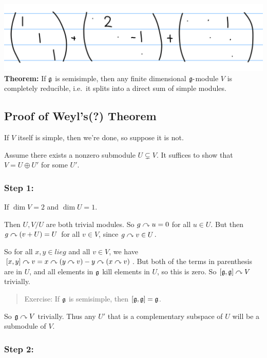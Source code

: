 \includegraphics{figures/2019-09-16-09:15.png}\\

\textbf{Theorem:} If \({\mathfrak{g}}\) is semisimple, then any finite
dimensional \({\mathfrak{g}}{\hbox{-}}\)module \(V\) is completely reducible, i.e.~it
splits into a direct sum of simple modules.

\hypertarget{proof-of-weyls-theorem}{%
\subsection{Proof of Weyl's(?) Theorem}\label{proof-of-weyls-theorem}}

If \(V\) itself is simple, then we're done, so suppose it is not.

Assume there exists a nonzero submodule \(U \subsetneq V\). It suffices
to show that \(V = U \oplus U'\) for some \(U'\).

\hypertarget{step-1}{%
\subsubsection{Step 1:}\label{step-1}}

If \(\dim V = 2\) and \(\dim U = 1\).

Then \(U, V / U\) are both trivial modules. So \(g\curvearrowright u = 0\) for
all \(u\in U\). But then \(g \curvearrowright (v + U) = U\) for all \(v\in V\),
since \(g\curvearrowright v \in U\).

So for all \(x,y \in lieg\) and all \(v\in V\), we have
\([x,y]\curvearrowright v = x\curvearrowright(y\curvearrowright v) - y\curvearrowright(x\curvearrowright v)\). But
both of the terms in parenthesis are in \(U\), and all elements in
\({\mathfrak{g}}\) kill elements in \(U\), so this is zero. So
\([{\mathfrak{g}}, {\mathfrak{g}}] \curvearrowright V\) trivially.

\begin{quote}
Exercise: If \({\mathfrak{g}}\) is semisimple, then \([{\mathfrak{g}}, {\mathfrak{g}}] = {\mathfrak{g}}\).
\end{quote}

So \({\mathfrak{g}} \curvearrowright V\) trivially. Thus any \(U'\) that is a
complementary subspace of \(U\) will be a submodule of \(V\).

\hypertarget{step-2}{%
\subsubsection{Step 2:}\label{step-2}}

